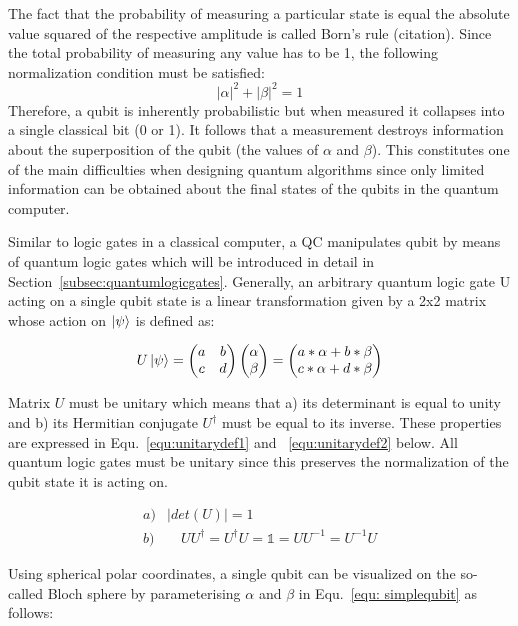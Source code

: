 The fact that the probability of measuring a particular state is equal the absolute value squared of the respective amplitude is called Born's rule (citation). Since the total probability of measuring any value has to be 1, the following normalization condition must be satisfied:
\begin{equation}
\label{equ: normalization}
{|\alpha|}^{2} + {|\beta|}^{2} =  1
\end{equation}
Therefore, a qubit is inherently probabilistic but when measured it collapses into a single classical bit (0 or 1). It follows that a measurement destroys information about the superposition of the qubit (the values of $\alpha$ and $\beta$). This constitutes one of the main difficulties when designing quantum algorithms since only limited information can be obtained about the final states of the qubits in the quantum computer.

Similar to logic gates in a classical computer, a QC manipulates qubit by means of quantum logic gates which will be introduced in detail in Section~\ref{subsec:quantumlogicgates}. Generally, an arbitrary quantum logic gate U acting on a single qubit state is a linear transformation given by a 2x2 matrix whose action on $\ket{\psi}$ is defined as:

\begin{equation}
\label{equ:unitarytransformation}
U \ket{\psi} = \begin{pmatrix}
 a & b \\ 
 c & d
 \end{pmatrix} \begin{pmatrix}\alpha\\\beta\end{pmatrix} = \begin{pmatrix}a*\alpha+b*\beta\\c*\alpha+d*\beta\end{pmatrix}
\end{equation}

Matrix $U$ must be unitary which means that a) its determinant is equal to unity and b) its Hermitian conjugate $U^\dagger$ must be equal to its inverse. These properties are expressed in Equ.~\ref{equ:unitarydef1} and ~\ref{equ:unitarydef2} below. All quantum logic gates must be unitary since this preserves the normalization of the qubit state it is acting on.

\begin{align}
\label{equ:unitarydef1}
a)& \mid det(U) \mid = 1 \\ 
\label{equ:unitarydef2}
b)& \quad UU^\dagger = U^\dagger U = \mathbb{1} = UU^{-1} = U^{-1}U
\end{align} 

Using spherical polar coordinates, a single qubit can be visualized on the so-called Bloch sphere by parameterising $\alpha$ and $\beta$ in Equ.~\ref{equ: simplequbit} as follows:

